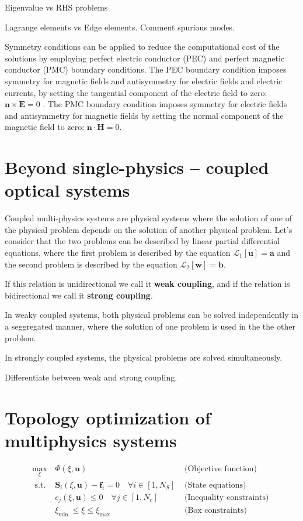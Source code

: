 Eigenvalue vs RHS problems


Lagrange elements vs Edge elements. Comment spurious modes.

Symmetry conditions can be applied to reduce the computational
cost of the solutions by employing perfect electric conductor (PEC) and perfect magnetic 
conductor (PMC) boundary conditions. The PEC boundary condition
imposes symmetry for magnetic fields and antisymmetry for electric fields and electric 
currents, by setting the tangential component of the electric field to zero: $\mathbf{n}\times \mathbf{E} = 0$ .
The PMC boundary condition imposes symmetry for electric fields and antisymmetry for magnetic fields
by setting the normal component of the magnetic field to zero: $\mathbf{n}\cdot \mathbf{H} = 0$.

\section{Beyond single-physics -- coupled optical systems}

Coupled multi-physics systems are physical systems where the solution of one of the physical 
problem depends on the solution of another physical problem. Let's consider that the two
problems can be described by linear partial differential equations, where the first problem
is described by the equation $\mathcal{L}_1 [\mathbf{u}]= \mathbf{a}$ and the second problem is described by the 
equation $\mathcal{L}_2 [\mathbf{w}]= \mathbf{b}$.

 If this relation is unidirectional
we call it \textbf{weak coupling}, and if the relation is bidirectional we call it 
\textbf{strong coupling}.

In weaky coupled systems, both physical problems can be solved independently in a seggregated 
manner, where the solution of one problem is used in the the other problem.

In strongly coupled systems, the physical problems are solved simultaneously.

Differentiate between weak and strong coupling.

\section{Topology optimization of multiphysics systems}

\begin{equation}
    \begin{array}{clr}
    \max\limits_{\xi} & \Phi(\xi, \mathbf{u}) & \text { (Objective function) } \\
    \text { s.t. } & \mathbf{S}_i(\xi, \mathbf{u})-\mathbf{f}_i=0 \quad \forall i \in\left[1, N_S\right] & \text { (State equations) } \\
    & c_j(\xi, \mathbf{u}) \leq 0 \quad \forall j \in\left[1, N_c\right] & \text { (Inequality constraints) } \\
    & \xi_{\text {min }} \leq \xi \leq \xi_{\text {max }} & \text { (Box constraints) }
    \end{array}
\end{equation}


